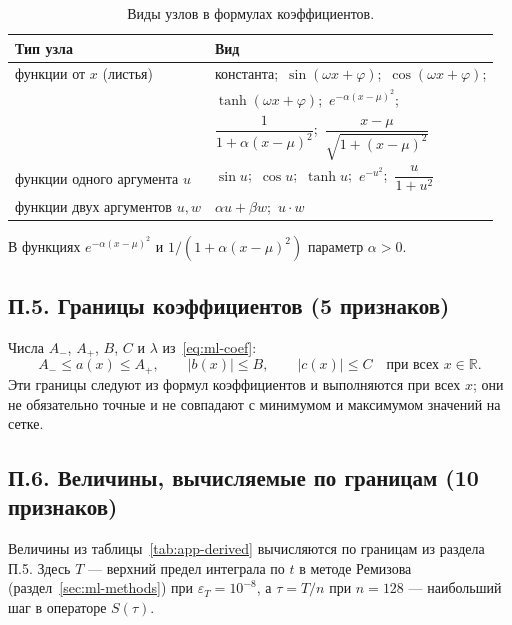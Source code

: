 \documentclass[14pt,a4paper]{extarticle}
\begin{document}
\begin{table}[!htbp]
\centering
\caption{Виды узлов в формулах коэффициентов.}
\label{tab:app-ops}
\renewcommand{\arraystretch}{1.3}
\begin{tabular}{>{\raggedright\arraybackslash}p{}l}
\toprule
Тип узла & Вид\\
\midrule
функции от $x$ (листья) & константа;\ $\sin(\omega x+\varphi)$;\ $\cos(\omega x+\varphi)$;\\
 & $\tanh(\omega x+\varphi)$;\ $e^{-\alpha(x-\mu)^2}$;\\
 & $\dfrac{1}{1+\alpha(x-\mu)^2}$;\ $\dfrac{x-\mu}{\sqrt{1+(x-\mu)^2}}$\\
\midrule
функции одного аргумента $u$ & $\sin u$;\ $\cos u$;\ $\tanh u$;\ $e^{-u^2}$;\ $\dfrac{u}{1+u^2}$\\
\midrule
функции двух аргументов $u,w$ & $\alpha u+\beta w$;\ $u\cdot w$\\
\bottomrule
\end{tabular}
\end{table}

В функциях $e^{-\alpha(x-\mu)^2}$ и $1/(1+\alpha(x-\mu)^2)$ параметр $\alpha>0$.

\subsection*{П.5. Границы коэффициентов (5 признаков)}
Числа $A_-$, $A_+$, $B$, $C$ и $\lambda$ из~\eqref{eq:ml-coef}:
\[
A_-\le a(x)\le A_+,\qquad |b(x)|\le B,\qquad |c(x)|\le C
\quad\text{при всех } x\in\mathbb R.
\]
Эти границы следуют из формул коэффициентов и выполняются при всех $x$;
они не обязательно точные и не совпадают с минимумом и максимумом
значений на сетке.

\subsection*{П.6. Величины, вычисляемые по границам (10 признаков)}
Величины из таблицы~\ref{tab:app-derived} вычисляются по границам
из раздела П.5. Здесь $T$ --- верхний предел интеграла по $t$ в методе
Ремизова (раздел~\ref{sec:ml-methods}) при $\varepsilon_T=10^{-8}$,
а $\tau=T/n$ при $n=128$ --- наибольший шаг в операторе $S(\tau)$.
\end{document}
